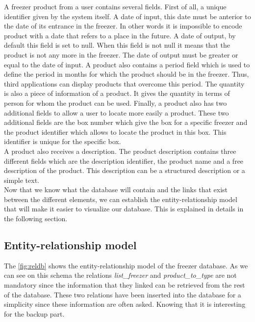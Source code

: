 A freezer product from a user contains several fields. First of all, a unique identifier given by the system itself. A date of input, this date must be anterior to the date of its entrance in the freezer. In other words it is impossible to encode product with a date that refers to a place in the future. A date of output, by default this field is set to null. When this field is not null it means that the product is not any more in the freezer. The date of output must be greater or equal to the date of input. A product also contains a period field which is used to define the period in months for which the product should be in the freezer. Thus, third applications can display products that overcome this period. The quantity is also a piece of information of a product. It gives  the quantity in terms of person for whom the product can be used. Finally, a product also has two additional fields to allow a user to locate more easily a product. These two additional fields are the box number which give the box for a specific freezer and the product identifier which allows to locate the product in this box. This identifier is unique for the specific box.\\

A product also receives a description. The product description contains three different fields which are the description identifier, the product name and a free description of the product. This description can be a structured description or a simple text. \\

Now that we know what the database will contain and the links that exist between the different elements, we can establish the entity-relationship model that will make it easier to visualize our database. This is explained in details in the following section.

\subsection{Entity-relationship model}
The \autoref{fig:reldb} shows the entity-relationship model of the freezer database. As we can see on this schema the relations \textit{list\_freezer} and \textit{product\_to\_type} are not mandatory since the information that they linked can be retrieved from the rest of the database. These two relations have been inserted into the database for a simplicity since these information are often asked. Knowing that it is interesting for the backup part. \\

